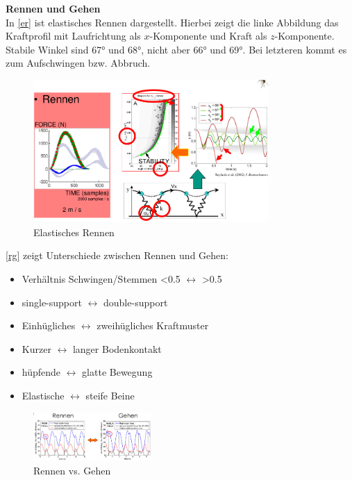 \textbf{Rennen und Gehen}\\
In \autoref{er} ist elastisches Rennen dargestellt. Hierbei zeigt die linke Abbildung das Kraftprofil mit Laufrichtung als $x$-Komponente und Kraft als $z$-Komponente. Stabile Winkel sind 67° und 68°, nicht aber 66° und 69°. Bei letzteren kommt es zum Aufschwingen bzw. Abbruch.
\begin{figure}[h!]
	\centering
	\includegraphics[width=0.8\textwidth]{figures/ch06_rennen.png}
	\caption{Elastisches Rennen}
	\label{er}
\end{figure}
\autoref{rg} zeigt Unterschiede zwischen Rennen und Gehen:
\begin{itemize}
\item Verhältnis Schwingen/Stemmen <0.5 $\leftrightarrow$ >0.5
\item single-support $\leftrightarrow$ double-support
\item Einhügliches $\leftrightarrow$ zweihügliches Kraftmuster
\item Kurzer $\leftrightarrow$ langer Bodenkontakt
\item hüpfende $\leftrightarrow$ glatte Bewegung
\item Elastische $\leftrightarrow$ steife Beine
\end{itemize}
\begin{figure}[h!]
	\centering
	\includegraphics[width=0.4\textwidth]{figures/ch06_uebergang1.png}
	\caption{Rennen vs. Gehen}
	\label{rg}
\end{figure}

